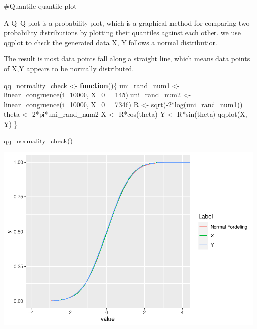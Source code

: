 \documentclass[
]{article}
\newenvironment{Shaded}{\begin{snugshade}}{\end{snugshade}}
\newcommand{\AttributeTok}[1]{\textcolor[rgb]{0.77,0.63,0.00}{#1}}
\newcommand{\ControlFlowTok}[1]{\textcolor[rgb]{0.13,0.29,0.53}{\textbf{#1}}}
\newcommand{\DecValTok}[1]{\textcolor[rgb]{0.00,0.00,0.81}{#1}}
\newcommand{\FunctionTok}[1]{\textcolor[rgb]{0.00,0.00,0.00}{#1}}
\newcommand{\NormalTok}[1]{#1}
\newcommand{\OtherTok}[1]{\textcolor[rgb]{0.56,0.35,0.01}{#1}}
\newcommand{\SpecialCharTok}[1]{\textcolor[rgb]{0.00,0.00,0.00}{#1}}
\begin{document}
\#Quantile-quantile plot

A Q--Q plot is a probability plot, which is a graphical method for
comparing two probability distributions by plotting their quantiles
against each other. we use qqplot to check the generated data X, Y
follows a normal distribution.

The result is most data points fall along a straight line, which means
data points of X,Y appears to be normally distributed.

\begin{Shaded}
\begin{Highlighting}[]
\NormalTok{qq\_normality\_check }\OtherTok{\textless{}{-}} \ControlFlowTok{function}\NormalTok{()\{}
\NormalTok{  uni\_rand\_num1 }\OtherTok{\textless{}{-}} \FunctionTok{linear\_congruence}\NormalTok{(}\AttributeTok{i=}\DecValTok{10000}\NormalTok{, }\AttributeTok{X\_0 =} \DecValTok{145}\NormalTok{)}
\NormalTok{  uni\_rand\_num2 }\OtherTok{\textless{}{-}} \FunctionTok{linear\_congruence}\NormalTok{(}\AttributeTok{i=}\DecValTok{10000}\NormalTok{, }\AttributeTok{X\_0 =} \DecValTok{7346}\NormalTok{)}
\NormalTok{  R }\OtherTok{\textless{}{-}} \FunctionTok{sqrt}\NormalTok{(}\SpecialCharTok{{-}}\DecValTok{2}\SpecialCharTok{*}\FunctionTok{log}\NormalTok{(uni\_rand\_num1))}
\NormalTok{  theta }\OtherTok{\textless{}{-}} \DecValTok{2}\SpecialCharTok{*}\NormalTok{pi}\SpecialCharTok{*}\NormalTok{uni\_rand\_num2}
\NormalTok{  X }\OtherTok{\textless{}{-}}\NormalTok{ R}\SpecialCharTok{*}\FunctionTok{cos}\NormalTok{(theta)}
\NormalTok{  Y }\OtherTok{\textless{}{-}}\NormalTok{ R}\SpecialCharTok{*}\FunctionTok{sin}\NormalTok{(theta)}
  \FunctionTok{qqplot}\NormalTok{(X, Y)}
\NormalTok{\}}

\FunctionTok{qq\_normality\_check}\NormalTok{()}
\end{Highlighting}
\end{Shaded}

\includegraphics{TP2_files/figure-latex/unnamed-chunk-6-1.pdf}
\end{document}
